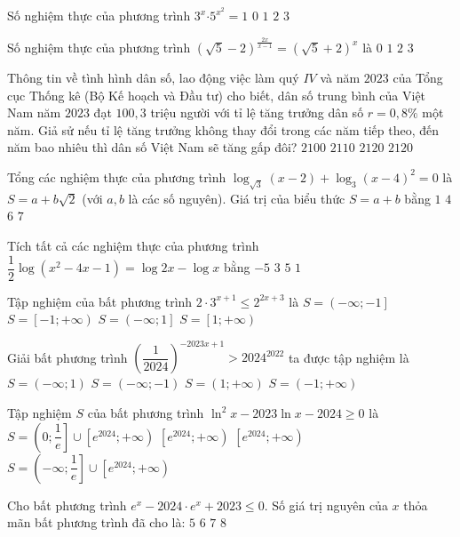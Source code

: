 \begin{ex}
Số nghiệm thực của phương trình $3^x{{ \cdot 5}^{x^2}}=1$
\choice
{$0$}
{$1$}
{$2$}
{$3$}
\end{ex}
\begin{ex}
Số nghiệm thực của phương trình ${{\left(\sqrt{5}-2\right)}^{\tfrac{2x}{x-1}}}={{\left(\sqrt{5}+2\right)}^x}$ là
\choice
{$0$}
{$1$}
{$2$}
{$3$}
\end{ex}
\begin{ex}
Thông tin về tình hình dân số, lao động việc làm quý $IV$ và năm $2023$ của Tổng cục Thống kê (Bộ Kế hoạch và Đầu tư) cho biết, dân số trung bình của Việt Nam năm $2023$ đạt $100{,}3$ triệu người với tỉ lệ tăng trưởng dân số $r=0{,}8\%$ một năm. Giả sử nếu tỉ lệ tăng trưởng không thay đổi trong các năm tiếp theo, đến năm bao nhiêu thì dân số Việt Nam sẽ tăng gấp đôi?
\choice
{$2100$}
{$2110$}
{$2120$}
{$2120$}
\end{ex}
\begin{ex}
Tổng các nghiệm thực của phương trình ${{\log }_{\sqrt{3}}}(x-2)+{{\log _3(x-4)}^2}=0$ là $S=a+b\sqrt{2}$ (với $a,b$ là các số nguyên). Giá trị của biểu thức $S=a+b$ bằng
\choice
{$1$}
{$4$}
{$6$}
{$7$}
\end{ex}
\begin{ex}
Tích tất cả các nghiệm thực của phương trình $\dfrac{1}{2}\log \left(x^2-4x-1\right)=\log 2x-\log x$ bằng
\choice
{$-5$}
{$3$}
{$5$}
{$1$}
\end{ex}
\begin{ex}
Tập nghiệm của bất phương trình ${{2 \cdot 3}^{x+1}}\le {2^{2x+3}}$ là
\choice
{$S=\left(-\infty ;-1\right]$}
{$S=\left[-1;+\infty\right)$}
{$S=\left(-\infty ;1\right]$}
{$S=\left[1;+\infty\right)$}
\end{ex}
\begin{ex}
Giải bất phương trình ${\left(\dfrac{1}{2024}\right)}^{-2023x+1}>2024^{2022}$ ta được tập nghiệm là
\choice
{$S=\left(-\infty ;1\right)$}
{$S=\left(-\infty ;-1\right)$}
{$S=\left(1;+\infty\right)$}
{$S=\left(-1;+\infty\right)$}
\end{ex}
\begin{ex}
Tập nghiệm $S$ của bất phương trình ${{\ln }^2}x-2023\ln x-2024\ge 0$ là
\choice
{$S=\left(0;\dfrac{1}{e}\right]\cup \left[{e^{2024}};+\infty\right)$}
{$\left[{e^{2024}};+\infty\right)$}
{$\left[{e^{2024}};+\infty\right)$}
{$S=\left(-\infty ;\dfrac{1}{e}\right]\cup \left[{e^{2024}};+\infty\right)$}
\end{ex}
\begin{ex}
Cho bất phương trình $e^x-2024 \cdot e^x+2023\le 0$. Số giá trị nguyên của $x$ thỏa mãn bất phương trình đã cho là:
\choice
{$5$}
{$6$}
{$7$}
{$8$}
\end{ex}
